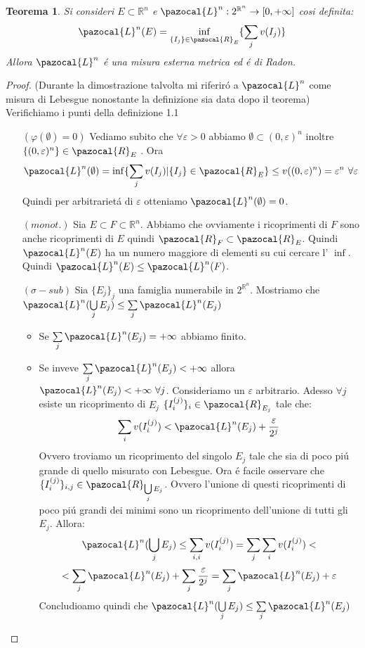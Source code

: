 \documentclass[11pt,a4paper]{report}
\theoremstyle{plain}
\newtheorem{thm}{Teorema}[chapter] %
\theoremstyle{definition}
\newcommand{\Le}{\pazocal{L}}
\begin{document}
\begin{thm}
Si consideri $E \subset \mathbb{R}^n$ e $\Le^n : 2^{\mathbb{R}^n} \rightarrow [0,+\infty]$ cosi definita:
	\[
		\Le^n(E) = \inf\limits_{\{I_j\} \in \pazocal{R}_E}\{\sum_jv(I_j)\}
	\]
	Allora $\Le^n$ \'e una misura esterna metrica ed \'e di Radon.
\end{thm}
\begin{proof}
	(Durante la dimostrazione talvolta mi riferir\'o a $\Le^n$ come misura di Lebesgue nonostante la definizione sia data dopo il teorema)\\
	Verifichiamo i punti della definizione 1.1\\
	\begin{itemize}
		\item[$(\varphi(\emptyset) = 0)$] Vediamo subito che $\forall \varepsilon > 0$ abbiamo $\emptyset \subset (0, \varepsilon)^n$  inoltre $\{(0, \varepsilon)^n\} \in \pazocal{R}_E$ . Ora
		\[
			\Le^n(\emptyset) = \inf\{\sum\limits_{j}v(I_j) | \{I_j\} \in \pazocal{R}_E \} \le v((0,\varepsilon )^n) = \varepsilon^n\ \forall \varepsilon		
		\]
		Quindi per arbitrariet\'a di $\varepsilon$ otteniamo $\Le^n(\emptyset) = 0$.
		\item[$(monot.)$] Sia $E \subset F \subset \mathbb{R}^n$. Abbiamo che ovviamente i ricoprimenti di $F$ sono anche ricoprimenti di $E$ quindi $\pazocal{R}_F \subset \pazocal{R}_E$. Quindi $\Le^n(E)$ ha un numero maggiore di elementi su cui cercare l' $\inf$. Quindi $\Le^n(E) \le \Le^n(F)$.
		\item[$(\sigma-sub)$] Sia $\{E_j\}_j$ una famiglia numerabile in $2^{\mathbb{R}^n}$. Mostriamo che $\Le^n(\bigcup\limits_{j}E_j) \le \sum\limits_{j}\Le^n(E_j)$
		\begin{itemize}
			\item Se $\sum\limits_{j}\Le^n(E_j) = +\infty$ abbiamo finito.
			\item Se inveve $\sum\limits_{j}\Le^n(E_j) < +\infty$ allora $\Le^n(E_j) <+\infty\ \forall j$. Consideriamo un $\varepsilon$ arbitrario. Adesso $\forall j$ esiste un ricoprimento di $E_j$ $\{I_{i}^{(j)}\}_i \in \pazocal{R}_{E_j}$ tale che:
			\[
				\sum\limits_iv(I_{i}^{(j)}) < \Le^n(E_j) + \frac{\varepsilon}{2^j}			
			\]
			Ovvero troviamo un ricoprimento del singolo $E_j$ tale che sia di poco pi\'u grande di quello misurato con Lebesgue. Ora \'e facile osservare che $\{I_{i}^{(j)}\}_{i,j} \in \pazocal{R}_{\bigcup\limits_jE_j}$. Ovvero l'unione di questi ricoprimenti di poco pi\'u grandi dei minimi sono un ricoprimento dell'unione di tutti gli $E_j$. Allora:
			\[
				\Le^n(\bigcup_jE_j) \le \sum\limits_{i,i}v(I_{i}^{(j)}) = \sum\limits_j\sum\limits_iv(I_{i}^{(j)}) <
			\]
			\[
				< \sum\limits_j\Le^n(E_j) + \sum\limits_j \frac{\varepsilon}{2^j} = \sum\limits_j\Le^n(E_j) + \varepsilon
			\]
			Concludioamo quindi che $\Le^n(\bigcup\limits_jE_j) \le \sum\limits_j\Le^n(E_j)$
		\end{itemize}


\end{itemize}
\end{proof}
\end{document}
